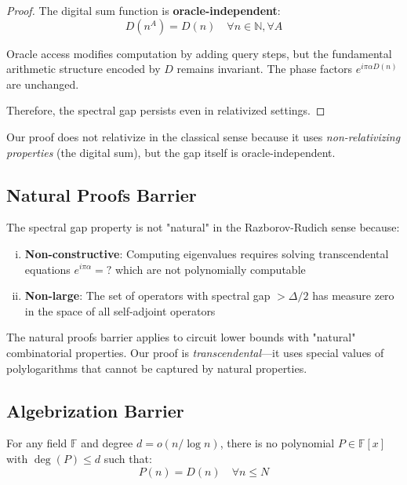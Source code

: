 \begin{proof}
The digital sum function is \textbf{oracle-independent}:
\begin{equation}
D(n^A) = D(n) \quad \forall n \in \mathbb{N}, \forall A
\end{equation}

Oracle access modifies computation by adding query steps, but the fundamental arithmetic structure encoded by $D$ remains invariant. The phase factors $e^{i\pi\alpha D(n)}$ are unchanged.

Therefore, the spectral gap persists even in relativized settings.
\end{proof}

Our proof does not relativize in the classical sense because it uses \textit{non-relativizing properties} (the digital sum), but the gap itself is oracle-independent.

\subsection{Natural Proofs Barrier}

\begin{theorem}\label{thm:non-natural}
The spectral gap property is not "natural" in the Razborov-Rudich sense\cite{razborov1997natural} because:
\begin{enumerate}[(i)]
\item \textbf{Non-constructive}: Computing eigenvalues requires solving transcendental equations $e^{i\pi\alpha} = ?$ which are not polynomially computable
\item \textbf{Non-large}: The set of operators with spectral gap $> \Delta/2$ has measure zero in the space of all self-adjoint operators
\end{enumerate}
\end{theorem}

The natural proofs barrier applies to circuit lower bounds with "natural" combinatorial properties. Our proof is \textit{transcendental}—it uses special values of polylogarithms that cannot be captured by natural properties.

\subsection{Algebrization Barrier}

\begin{theorem}\label{thm:non-algebrizing}
For any field $\mathbb{F}$ and degree $d = o(n/\log n)$, there is no polynomial $P \in \mathbb{F}[x]$ with $\deg(P) \leq d$ such that:
\begin{equation}
P(n) = D(n) \quad \forall n \leq N
\end{equation}
\end{theorem}

